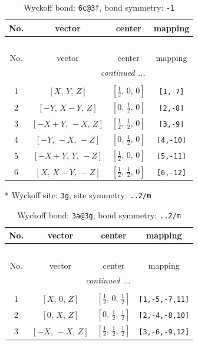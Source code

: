 \documentclass[fleqn,8pt]{jsarticle}
\begin{document}
\renewcommand{\arraystretch}{1.2}
\begin{longtable}{cccc}
\caption{Wyckoff bond: {\tt 6c@3f}, bond symmetry: {\tt -1}}
 \\
 \hline \hline
No. & vector & center & mapping \\ \hline \endfirsthead

\multicolumn{3}{l}{\tablename\ \thetable{}} \\
 \hline \hline
No. & vector & center & mapping \\ \hline \endhead

 \hline \hline
\multicolumn{3}{r}{\footnotesize\it continued ...} \\ \endfoot

 \hline \hline
\multicolumn{3}{r}{} \\ \endlastfoot

1 & $\left[ X,\, Y,\, Z \right]$ & $\left[ \frac{1}{2},\, 0,\, 0 \right]$ & {\tt [1,-7]} \\ \hline
2 & $\left[ - Y,\, X - Y,\, Z \right]$ & $\left[ 0,\, \frac{1}{2},\, 0 \right]$ & {\tt [2,-8]} \\ \hline
3 & $\left[ - X + Y,\, - X,\, Z \right]$ & $\left[ \frac{1}{2},\, \frac{1}{2},\, 0 \right]$ & {\tt [3,-9]} \\ \hline
4 & $\left[ - Y,\, - X,\, - Z \right]$ & $\left[ 0,\, \frac{1}{2},\, 0 \right]$ & {\tt [4,-10]} \\ \hline
5 & $\left[ - X + Y,\, Y,\, - Z \right]$ & $\left[ \frac{1}{2},\, 0,\, 0 \right]$ & {\tt [5,-11]} \\ \hline
6 & $\left[ X,\, X - Y,\, - Z \right]$ & $\left[ \frac{1}{2},\, \frac{1}{2},\, 0 \right]$ & {\tt [6,-12]} \\
\end{longtable}
* Wyckoff site: {\tt 3g}, site symmetry: {\tt ..2/m}
\renewcommand{\arraystretch}{1.2}
\begin{longtable}{cccc}
\caption{Wyckoff bond: {\tt 3a@3g}, bond symmetry: {\tt ..2/m}}
 \\
 \hline \hline
No. & vector & center & mapping \\ \hline \endfirsthead

\multicolumn{3}{l}{\tablename\ \thetable{}} \\
 \hline \hline
No. & vector & center & mapping \\ \hline \endhead

 \hline \hline
\multicolumn{3}{r}{\footnotesize\it continued ...} \\ \endfoot

 \hline \hline
\multicolumn{3}{r}{} \\ \endlastfoot

1 & $\left[ X,\, 0,\, Z \right]$ & $\left[ \frac{1}{2},\, 0,\, \frac{1}{2} \right]$ & {\tt [1,-5,-7,11]} \\ \hline
2 & $\left[ 0,\, X,\, Z \right]$ & $\left[ 0,\, \frac{1}{2},\, \frac{1}{2} \right]$ & {\tt [2,-4,-8,10]} \\ \hline
3 & $\left[ - X,\, - X,\, Z \right]$ & $\left[ \frac{1}{2},\, \frac{1}{2},\, \frac{1}{2} \right]$ & {\tt [3,-6,-9,12]} \\
\end{longtable}
\end{document}
